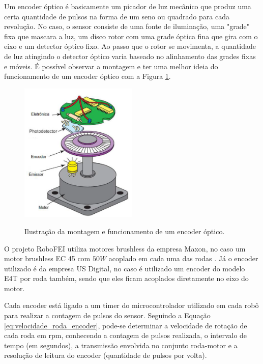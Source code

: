 \documentclass[acronym, symbols, table]{fei}
\begin{document}
				Um encoder óptico é basicamente um picador de luz mecânico que produz uma certa quantidade de pulsos na forma de um seno ou quadrado para cada revolução. No caso, o sensor consiste de uma fonte de iluminação, uma "grade" fixa que mascara a luz, um disco rotor com uma grade óptica fina que gira com o eixo e um detector óptico fixo. Ao passo que o rotor se movimenta, a quantidade de luz atingindo o detector óptico varia baseado no alinhamento das grades fixas e móveis. É possível observar a montagem e ter uma melhor ideia do funcionamento de um encoder óptico com a Figura \ref{fig:optical_encoder}.
				
				\begin{figure}[!htb]
					\centering
					\caption{Ilustração da montagem e funcionamento de um encoder óptico.} 
					\includegraphics[width=0.5\textwidth]{encoder_optico.png}
					\label{fig:optical_encoder}
				\end{figure}
				
				O projeto RoboFEI utiliza motores brushless da empresa Maxon\textregistered, no caso um motor brushless EC 45 com $50W$ acoplado em cada uma das rodas \cite{ec45_maxon}. Já o encoder utilizado é da empresa US Digital\textregistered \cite{e4t_encoder}, no caso é utilizado um encoder do modelo E4T por roda também, sendo que eles ficam acoplados diretamente no eixo do motor.
				
				Cada encoder está ligado a um timer do microcontrolador utilizado em cada robô para realizar a contagem de pulsos do sensor. Seguindo a Equação \ref{eq:velocidade_roda_encoder}, pode-se determinar a velocidade de rotação de cada roda em rpm, conhecendo a contagem de pulsos realizada, o intervalo de tempo (em segundos), a transmissão envolvida no conjunto roda-motor e a resolução de leitura do encoder (quantidade de pulsos por volta).
				
\end{document}
